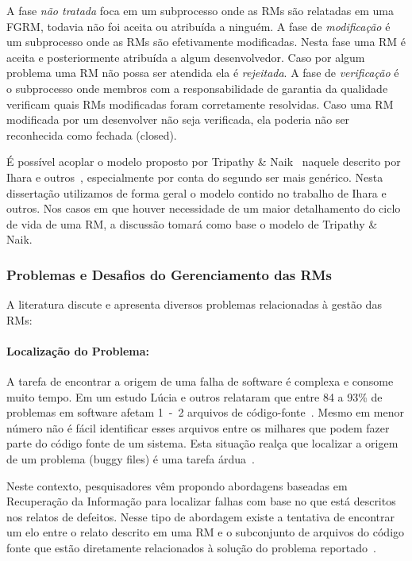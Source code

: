 A fase \textit{não tratada} foca em um subprocesso onde as RMs são relatadas em
uma FGRM, todavia não foi aceita ou atribuída a ninguém. A fase de
\textit{modificação} é um subprocesso onde as RMs são efetivamente modificadas.
Nesta fase uma RM é aceita e posteriormente atribuída a algum desenvolvedor.
Caso por algum problema uma RM não possa ser atendida ela é \textit{rejeitada}.
A fase de \textit{verificação} é o subprocesso onde membros com a
responsabilidade de garantia da qualidade verificam quais RMs modificadas foram
corretamente resolvidas. Caso uma RM modificada por um desenvolver não seja
verificada, ela poderia não ser reconhecida como fechada (closed).

É possível acoplar o modelo proposto por Tripathy \&
Naik~\cite{tripathy2014software} naquele descrito por Ihara e
outros~\cite{ihara2009analysis}, especialmente por conta do segundo ser mais
genérico.  Nesta dissertação utilizamos de forma geral o modelo contido no
trabalho de Ihara e outros. Nos casos em que houver necessidade de um maior
detalhamento do ciclo de vida de uma RM, a discussão tomará como base o modelo
de Tripathy \& Naik.
\todoend{}


\subsubsection{Problemas e Desafios do Gerenciamento das RMs}
\label{ssub:problemas_relacionadas_rm}

A literatura discute e apresenta diversos problemas relacionadas à gestão das
RMs:

\paragraph{Localização do Problema:} A tarefa de encontrar a origem de uma falha
de software é complexa e consome muito tempo. Em um estudo Lúcia e outros
relataram que entre 84 a 93\% de problemas em software afetam 1~-~2 arquivos de
código-fonte~\cite{thung2012faults}. Mesmo em menor número não é fácil identificar esses
arquivos entre os milhares que podem fazer parte do código fonte de um sistema. Esta situação
realça que localizar a origem de um problema (buggy files) é uma tarefa
árdua~\cite{Thung:2014:BIT:2635868.2661678}.

Neste contexto, pesquisadores vêm propondo abordagens baseadas em Recuperação da
Informação para localizar falhas com base no que está descritos nos relatos de
defeitos. Nesse tipo de abordagem existe a tentativa de encontrar um elo entre o
relato descrito em uma RM e o subconjunto de arquivos do código fonte que estão
diretamente relacionados à solução do problema
reportado~\cite{Wong:2014:BBF:2705615.2706096}.

